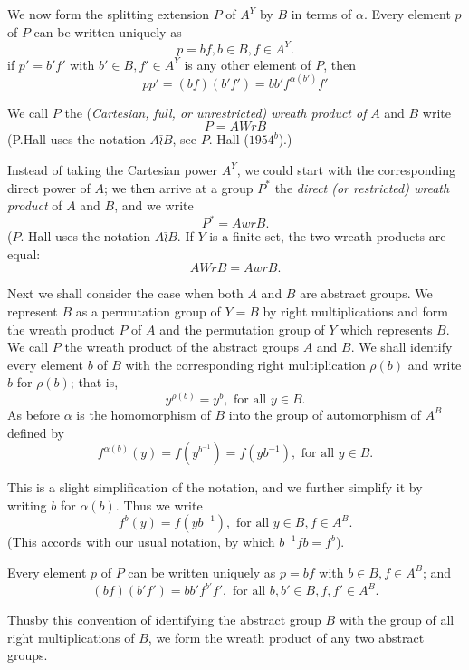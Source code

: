 We now form the splitting extension $P$ of $A^Y$ by $B$ in terms of
$\alpha$. Every element $p$ of $P$ can be written uniquely as  
$$
p = bf,  b \in  B, f \in  A^Y.
$$
if $p' = b' f'$ with $b' \in  B, f' \in  A^Y$ is any
other element of $P$, then 
$$
pp' = (bf)(b'f') = bb' f^{\alpha(b')}f'
$$

We call $P$ the (\textit{Cartesian, full, or unrestricted) wreath
  product of } $A $ and $B$ write 
$$
P = A Wr B
$$
(P.\pageoriginale Hall uses the notation $A \bar{\wr}B$, see $P$. Hall
($1954^b$).) 

Instead of taking the Cartesian power $A^Y$, we could start with the
corresponding direct power of $A$; we then arrive at a group $P^*$ the
\textit{direct (or restricted) wreath product} of $A$ and $B$, and we
write 
$$
P ^*= A wr B.
$$
($P$. Hall uses the notation $A \bar{\wr} B$. If $Y$ is a finite set,
the two wreath products are equal: 
$$
A Wr B = A wr B.
$$

Next we shall consider the case when both $A$ and $B$ are abstract
groups. We represent $B$ as a permutation group of $Y = B$ by right
multiplications and form the wreath product $P$ of $A$ and the
permutation group of $Y$ which represents $B$. We call $P$ the wreath
product of the abstract groups $A$ and $B$. We shall identify	every
element $b$ of $B$ with the corresponding right multiplication
$\rho(b)$ and write $b$ for $\rho(b)$; that is, 
$$
y^{\rho(b)} = y^b,   \text{   for all   } y \in  B.
$$
As before $\alpha$ is the homomorphism of $B$ into the group of
automorphism of $A^B$ defined by 
$$
f^{\alpha(b)}(y) = f(y^{b^{-1}}) = f(yb^{-1}), \text{ for all }y
\in  B. 
$$

This is a slight simplification of the notation, and we further
simplify it by writing $b$ for $\alpha(b)$. Thus we write 
$$
f^b(y) = f(yb^{-1}), \text{  for all  }y \in  B, f \in  A^B.
$$
(This accords with our usual notation, by which $b^{-1}f b = f^b$).

Every element $p$ of $P$ can be written uniquely as $p = bf$ with $b
\in  B,  f \in  A^B$; and  
$$
(bf) (b' f') = bb' f^{b'} f', \text{ for all } b,b' \in  B,
f,f' \in  A^B. 
$$

Thus\pageoriginale by this convention of identifying the abstract group $B$ with the
group of all right multiplications of $B$, we form the wreath product
of any two abstract groups. 

